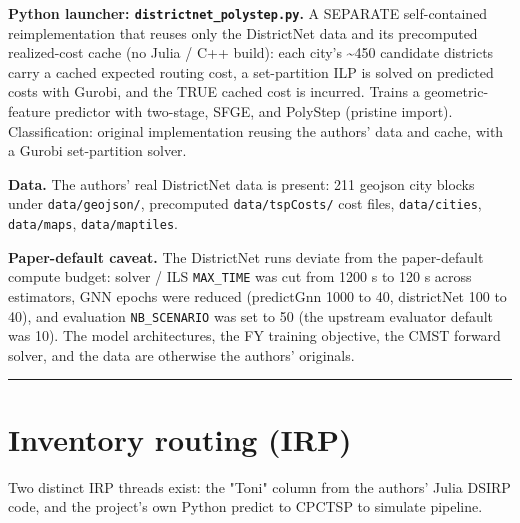 \documentclass[10pt]{article}
\begin{document}
\textbf{Python launcher: \texttt{districtnet\_polystep.py}.} A SEPARATE self-contained reimplementation that reuses only the
DistrictNet data and its precomputed realized-cost cache (no Julia / C++ build): each city's \textasciitilde{}450 candidate districts
carry a cached expected routing cost, a set-partition ILP is solved on predicted costs with Gurobi, and the TRUE cached
cost is incurred. Trains a geometric-feature predictor with two-stage, SFGE, and PolyStep (pristine import).
Classification: original implementation reusing the authors' data and cache, with a Gurobi set-partition solver.

\textbf{Data.} The authors' real DistrictNet data is present: 211 geojson city blocks under \texttt{data/geojson/}, precomputed
\texttt{data/tspCosts/} cost files, \texttt{data/cities}, \texttt{data/maps}, \texttt{data/maptiles}.

\textbf{Paper-default caveat.} The DistrictNet runs deviate from the paper-default compute budget: solver / ILS \texttt{MAX\_TIME}
was cut from 1200 s to 120 s across estimators, GNN epochs were reduced (predictGnn 1000 to 40, districtNet 100 to 40),
and evaluation \texttt{NB\_SCENARIO} was set to 50 (the upstream evaluator default was 10). The model architectures, the FY
training objective, the CMST forward solver, and the data are otherwise the authors' originals.

\medskip\hrule\medskip

\section*{Inventory routing (IRP)}

Two distinct IRP threads exist: the "Toni" column from the authors' Julia DSIRP code, and the project's own Python
predict to CPCTSP to simulate pipeline.
\end{document}
